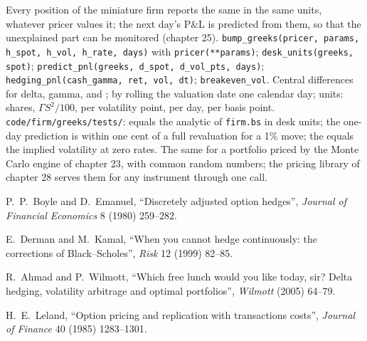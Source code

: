 \begin{build}
 Every position of the miniature firm reports the same  in
the same units, whatever pricer values it; the next day's P\&L is predicted from
them, so that the unexplained part can be monitored (chapter 25).
 \texttt{bump\_greeks(pricer, params, h\_spot, h\_vol, h\_rate,
days)} with \texttt{pricer(**params)}; \texttt{desk\_units(greeks, spot)};
\texttt{predict\_pnl(greeks, d\_spot, d\_vol\_pts, days)};
\texttt{hedging\_pnl(cash\_gamma, ret, vol, dt)}; \texttt{breakeven\_vol}.
 Central differences for delta, gamma,  and ;  by rolling the
valuation date one calendar day; units: shares, $\Gamma S^2/100$, per volatility
point, per day, per basis point.
 \texttt{code/firm/greeks/tests/}:  equals
the analytic  of \texttt{firm.bs} in desk units; the one-day prediction is
within one cent of a full revaluation for a 1\% move; the 
equals the implied volatility at zero rates.
 The same  for a portfolio priced by the Monte Carlo engine of
chapter 23, with common random numbers; the pricing library of chapter 28 serves
them for any instrument through one call.
\end{build}

\begin{omsources}
\item P.~P.~Boyle and D.~Emanuel, ``Discretely adjusted option hedges'',
\emph{Journal of Financial Economics} 8 (1980) 259--282.
\item E.~Derman and M.~Kamal, ``When you cannot hedge continuously: the
corrections of Black--Scholes'', \emph{Risk} 12 (1999) 82--85.
\item R.~Ahmad and P.~Wilmott, ``Which free lunch would you like today, sir?
Delta hedging, volatility arbitrage and optimal portfolios'', \emph{Wilmott}
(2005) 64--79.
\item H.~E.~Leland, ``Option pricing and replication with transactions costs'',
\emph{Journal of Finance} 40 (1985) 1283--1301.
\end{omsources}

